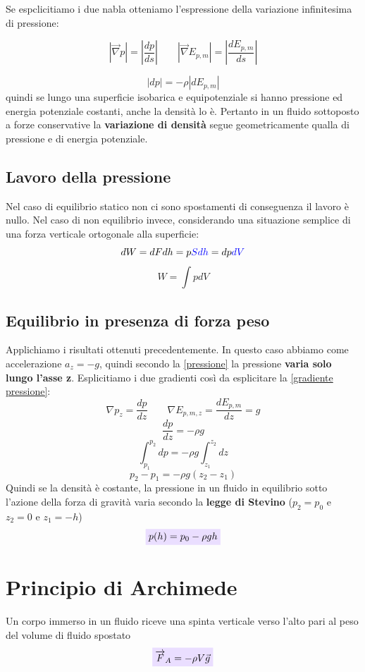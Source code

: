 \documentclass[x11names]{report}
\newcommand{\viola}[1]{\colorbox{yred}{$\displaystyle #1$}}
\begin{document}
	Se espclicitiamo i due nabla otteniamo l'espressione della variazione infinitesima di pressione:
	
	\[ 
	\boxed{\left|\overrightarrow{\nabla}p \right|= \left|\frac{dp}{ds}\right|} \qquad \boxed{\left|\overrightarrow{\nabla}E_{p,m} \right|= \left|\frac{dE_{p,m}}{ds}\right|}
	\]
	
	\[ 
	|dp |= -\rho |dE_{p,m}|
	\]
	quindi se lungo una superficie isobarica e equipotenziale si hanno pressione ed energia potenziale costanti, anche la densità lo è. Pertanto in un fluido sottoposto a forze conservative la \textbf{variazione di densità} segue geometricamente qualla di pressione e di energia potenziale.
	
	\subsection{Lavoro della pressione}
	Nel caso di equilibrio statico non ci sono spostamenti di conseguenza il lavoro è nullo. Nel caso di non equilibrio invece, considerando una situazione semplice di una forza verticale ortogonale alla superficie:
	\[ 
	dW = dF dh = p\textcolor{blue}{S dh }= dp \textcolor{blue}{dV }
	\] 
	\begin{equation}
		W = \int{pdV}
	\end{equation}
	
	\subsection{Equilibrio in presenza di forza peso}
	Applichiamo i risultati ottenuti precedentemente. In questo caso abbiamo come accelerazione \(a_z = -g\), quindi secondo la \ref{pressione} la pressione \textbf{varia solo lungo l'asse z}. Esplicitiamo i due gradienti così da esplicitare la \ref{gradiente pressione}:
	\[ 
	\boxed{\nabla p_z = \frac{d p}{d z} }\qquad \boxed{\nabla E_{p,m,z} = \frac{d E_{p,m}}{d z} = g}
	\]
	\[ 
	\frac{dp}{dz} = -\rho g
	\]
	\[ 
	\int_{p_1}^{p_2}dp = -\rho g \int_{z_1}^{z_2}dz
	\]
	\[ 
	p_2 - p_1 = -\rho g (z_2 - z_1)
	\]
	Quindi se la densità è costante, la pressione in un fluido in equilibrio sotto l'azione della forza di gravità varia secondo la \textbf{legge di Stevino }(\(p_2 = p_0\) e \(z_2 = 0\) e \(z_1 = -h\))
	\begin{equation}\label{stevino}
		\viola{ p(h) = p_0 -\rho g h}
	\end{equation}
	
	\section{Principio di Archimede}
	Un corpo immerso in un fluido riceve una spinta verticale verso l'alto  pari al peso del volume di fluido spostato
	\begin{equation}
		\viola{	\overrightarrow{F}_A = -\rho V \vec{g}}
	\end{equation}
	
\end{document}
